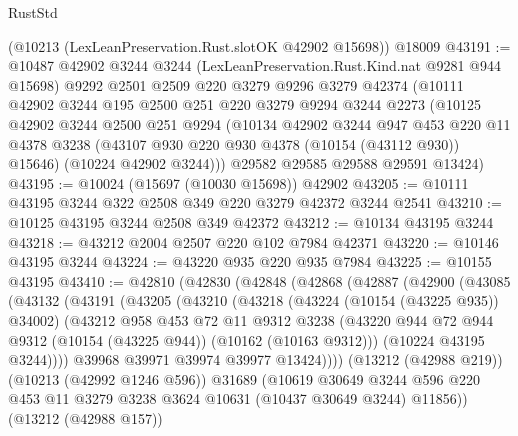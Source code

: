 \begin{lexlean}{RustStd}
\begin{coremodule}
    (@10213 (LexLeanPreservation.Rust.slotOK @42902 @15698))
    @18009
@43191 := @10487
    @42902
    @3244
    @3244
    (LexLeanPreservation.Rust.Kind.nat @9281 @944 @15698)
    @9292
    @2501
    @2509
    @220
    @3279
    @9296
    @3279
    @42374
    (@10111
      @42902
      @3244
      @195
      @2500
      @251
      @220
      @3279
      @9294
      @3244
      @2273
      (@10125
        @42902
        @3244
        @2500
        @251
        @9294
        (@10134
          @42902
          @3244
          @947
          @453
          @220
          @11
          @4378
          @3238
          (@43107 @930 @220 @930 @4378 (@10154 (@43112 @930)) @15646)
          (@10224 @42902 @3244)))
      @29582
      @29585
      @29588
      @29591
      @13424)
@43195 := @10024 (@15697 (@10030 @15698)) @42902
@43205 := @10111 @43195 @3244 @322 @2508 @349 @220 @3279 @42372 @3244 @2541
@43210 := @10125 @43195 @3244 @2508 @349 @42372
@43212 := @10134 @43195 @3244
@43218 := @43212 @2004 @2507 @220 @102 @7984 @42371
@43220 := @10146 @43195 @3244
@43224 := @43220 @935 @220 @935 @7984
@43225 := @10155 @43195
@43410 := @42810
    (@42830
      (@42848
        (@42868
          (@42887
            (@42900
              (@43085
                (@43132
                  (@43191
                    (@43205
                      (@43210
                        (@43218
                          (@43224 (@10154 (@43225 @935)) @34002)
                          (@43212
                            @958
                            @453
                            @72
                            @11
                            @9312
                            @3238
                            (@43220
                              @944
                              @72
                              @944
                              @9312
                              (@10154 (@43225 @944))
                              (@10162 (@10163 @9312)))
                            (@10224 @43195 @3244))))
                      @39968
                      @39971
                      @39974
                      @39977
                      @13424))))
              (@13212 (@42988 @219))
              (@10213 (@42992 @1246 @596))
              @31689
              (@10619
                @30649
                @3244
                @596
                @220
                @453
                @11
                @3279
                @3238
                @3624
                @10631
                (@10437 @30649 @3244)
                @11856))
            (@13212 (@42988 @157))

\end{coremodule}
\end{lexlean}
